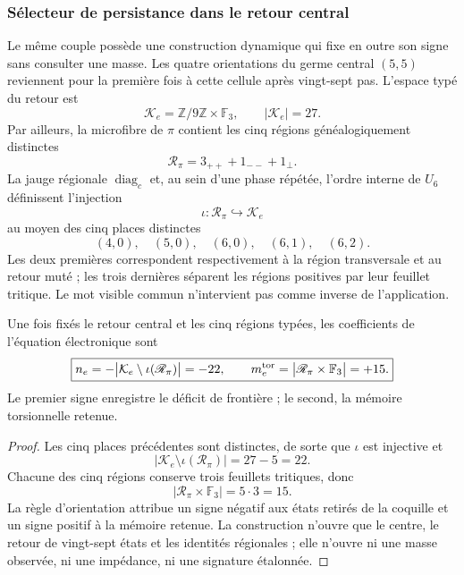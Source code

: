 \subsubsection{Sélecteur de persistance dans le retour central}

Le même couple possède une construction dynamique qui fixe en outre son signe sans
consulter une masse. Les quatre orientations du germe central
\((5,5)\) reviennent pour la première fois à cette cellule après vingt-sept pas.
L'espace typé du retour est
\[
 \mathcal K_e=\mathbb Z/9\mathbb Z\times\mathbb F_3,
 \qquad |\mathcal K_e|=27.
\]
Par ailleurs, la microfibre de \(\pi\) contient les cinq régions
généalogiquement distinctes
\[
 \mathscr R_\pi=3_{++}+1_{--}+1_{\perp}.
\]
La jauge régionale \(\operatorname{diag}_c\) et, au sein d'une phase répétée,
l'ordre interne de \(U_6\) définissent l'injection
\[
 \iota:\mathscr R_\pi\hookrightarrow\mathcal K_e
\]
au moyen des cinq places distinctes
\[
 (4,0),\quad(5,0),\quad(6,0),\quad(6,1),\quad(6,2).
\]
Les deux premières correspondent respectivement à la région transversale et
au retour muté ; les trois dernières séparent les régions positives par leur
feuillet tritique. Le mot visible commun n'intervient pas comme inverse de l'application.

\begin{theorem}
\label{thm:selector-persistencia-electron-rev7}
Une fois fixés le retour central et les cinq régions typées, les coefficients de
l'équation électronique sont
\[
 \boxed{
 n_e=-\bigl|\mathcal K_e\setminus\iota(\mathscr R_\pi)\bigr|=-22,
 \qquad
 m_e^{\rm tor}=\bigl|\mathscr R_\pi\times\mathbb F_3\bigr|=+15.}
\]
Le premier signe enregistre le déficit de frontière ; le second, la mémoire
torsionnelle retenue.
\end{theorem}

\begin{proof}
Les cinq places précédentes sont distinctes, de sorte que \(\iota\) est
injective et
\[
 |\mathcal K_e\setminus\iota(\mathscr R_\pi)|=27-5=22.
\]
Chacune des cinq régions conserve trois feuillets tritiques, donc
\[
 |\mathscr R_\pi\times\mathbb F_3|=5\cdot3=15.
\]
La règle d'orientation attribue un signe négatif aux états retirés de la
coquille et un signe positif à la mémoire retenue. La construction n'ouvre que le
centre, le retour de vingt-sept états et les identités régionales ; elle
n'ouvre ni une masse observée, ni une impédance, ni une signature étalonnée.
\end{proof}

